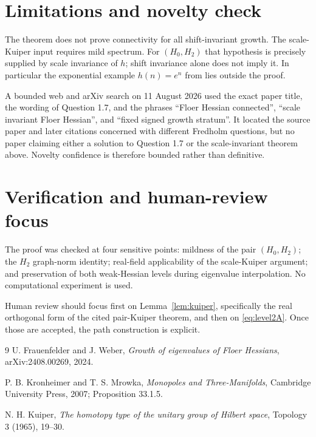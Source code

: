 \documentclass[11pt]{article}
\begin{document}
\section{Limitations and novelty check}

The theorem does not prove connectivity for all shift-invariant growth.  The
scale-Kuiper input requires mild spectrum.  For $(H_0,H_2)$ that hypothesis is
precisely supplied by scale invariance of $h$; shift invariance alone does not
imply it.  In particular the exponential example $h(n)=e^n$ from \cite{FW}
lies outside the proof.

A bounded web and arXiv search on 11 August 2026 used the exact paper title,
the wording of Question 1.7, and the phrases ``Floer Hessian connected'',
``scale invariant Floer Hessian'', and ``fixed signed growth stratum''.  It
located the source paper and later citations concerned with different
Fredholm questions, but no paper claiming either a solution to Question 1.7
or the scale-invariant theorem above.  Novelty confidence is therefore
bounded rather than definitive.

\section{Verification and human-review focus}

The proof was checked at four sensitive points: mildness of the pair
$(H_0,H_2)$; the $H_2$ graph-norm identity; real-field applicability of the
scale-Kuiper argument; and preservation of both weak-Hessian levels during
eigenvalue interpolation.  No computational experiment is used.

Human review should focus first on Lemma~\ref{lem:kuiper}, specifically the
real orthogonal form of the cited pair-Kuiper theorem, and then on
\eqref{eq:level2A}.  Once those are accepted, the path construction is
explicit.

\begin{thebibliography}{9}
U. Frauenfelder and J. Weber,
\emph{Growth of eigenvalues of Floer Hessians},
arXiv:2408.00269, 2024.

P. B. Kronheimer and T. S. Mrowka,
\emph{Monopoles and Three-Manifolds},
Cambridge University Press, 2007; Proposition 33.1.5.

N. H. Kuiper,
\emph{The homotopy type of the unitary group of Hilbert space},
Topology 3 (1965), 19--30.
\end{thebibliography}
\end{document}
